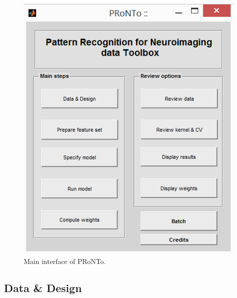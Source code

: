 \begin{figure}[!h]
	\centering
		\includegraphics[scale=0.8]{images/Tutorial/classification/mainInterface.png}
	\caption{Main interface of PRoNTo.}
	\label{fig:mainInterface}
\end{figure}

\subsection{Data \& Design}

